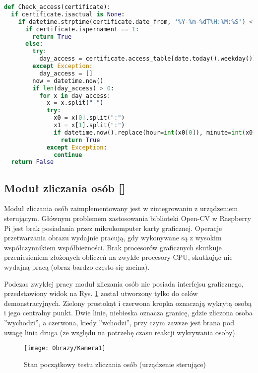 {\footnotesize 
	\begin{lstlisting}[caption={Funkcja Check-access urządzenia sterującego}, label={lst:RPI check access}, language=Python]
def Check_access(certificate):
  if certificate.isactual is None:
    if datetime.strptime(certificate.date_from, '%Y-%m-%dT%H:%M:%S') < datetime.now() < datetime.strptime( certificate.date_to, '%Y-%m-%dT%H:%M:%S'):
      if certificate.ispernament == 1:
        return True
      else:
        try:
          day_access = certificate.access_table[date.today().weekday()].split(";")
        except Exception:
          day_access = []
        now = datetime.now()
        if len(day_access) > 0:
          for x in day_access:
            x = x.split("-")
            try:
              x0 = x[0].split(":")
              x1 = x[1].split(":")
              if datetime.now().replace(hour=int(x0[0]), minute=int(x0[1])) <= now < datetime.now().replace(hour=int(x1[0]), minute=int(x1[1])):
                return True
            except Exception:
              continue
  return False
	\end{lstlisting}}
\newpage
\subsection{Moduł zliczania osób [\StudentA]}
	Moduł zliczania osób zaimplementowany jest w zintegrowaniu z urządzeniem sterującym. Głównym problemem zastosowania biblioteki Open-CV w Raspberry Pi jest brak posiadania przez mikrokomputer karty graficznej. Operacje przetwarzania obrazu wydajnie pracują, gdy wykonywane są z wysokim współczynnikiem współbieżności. Brak procesorów graficznych skutkuje przeniesieniem złożonych obliczeń na zwykłe procesory CPU, skutkując nie wydajną pracą (obraz bardzo często się zacina). 
	
	Podczas zwykłej pracy moduł zliczania osób nie posiada interfejsu graficznego, przedstawiony widok na Rys. \ref{rys:Zliczanie osob} został utworzony tylko do celów demonstracyjnych. Zielony prostokąt i czerwona kropka oznaczają wykrytą osobą i jego centralny punkt. Dwie linie, niebieska oznacza granicę, gdzie zliczona osoba ''wychodzi'', a czerwona, kiedy ''wchodzi'', przy czym zawsze jest brana pod uwagę linia druga (ze względu na potrzebę czasu reakcji wykrywania osoby).
	
	\begin{figure}[ht!]
		\centering
		\texttt{[image: Obrazy/Kamera1]}
		\caption{Stan początkowy testu zliczania osób (urządzenie sterujące)}
		\label{rys:Zliczanie osob}
	\end{figure}
	
